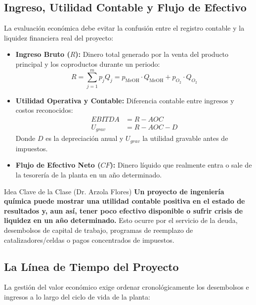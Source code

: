 \documentclass[11pt,letterpaper]{article}
\begin{document}
\subsection{Ingreso, Utilidad Contable y Flujo de Efectivo}
La evaluación económica debe evitar la confusión entre el registro contable y la liquidez financiera real del proyecto:
\begin{itemize}[leftmargin=*]
    \item \textbf{Ingreso Bruto ($R$):} Dinero total generado por la venta del producto principal y los coproductos durante un periodo:
    \begin{equation}
        R = \sum_{j=1}^m p_j Q_j = p_{\text{MeOH}} \cdot Q_{\text{MeOH}} + p_{O_2} \cdot Q_{O_2}
    \end{equation}
    \item \textbf{Utilidad Operativa y Contable:} Diferencia contable entre ingresos y costos reconocidos:
    \begin{align}
        EBITDA &= R - AOC \\
        U_{grav} &= R - AOC - D
    \end{align}
    Donde $D$ es la depreciación anual y $U_{grav}$ la utilidad gravable antes de impuestos.
    \item \textbf{Flujo de Efectivo Neto ($CF$):} Dinero líquido que realmente entra o sale de la tesorería de la planta en un año determinado.
\end{itemize}

\begin{warningbox}{Idea Clave de la Clase (Dr. Arzola Flores)}
\textbf{Un proyecto de ingeniería química puede mostrar una utilidad contable positiva en el estado de resultados y, aun así, tener poco efectivo disponible o sufrir crisis de liquidez en un año determinado.} Esto ocurre por el servicio de la deuda, desembolsos de capital de trabajo, programas de reemplazo de catalizadores/celdas o pagos concentrados de impuestos.
\end{warningbox}

\subsection{La Línea de Tiempo del Proyecto}
La gestión del valor económico exige ordenar cronológicamente los desembolsos e ingresos a lo largo del ciclo de vida de la planta:
\end{document}
